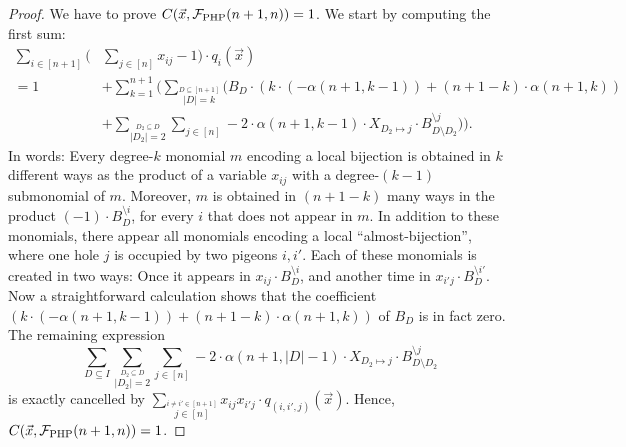\documentclass[10pt,a4paper]{article}
\newcommand{\Ff}{{\cal F}}
\newcommand{\PHP}{\Ff_{\mathrm{PHP}}}
\begin{document}
\begin{proof}
	We have to prove $C(\vec x, \PHP(n+1,n)) = 1$. We start by computing the first sum:
	\begin{align*}
		\sum_{i \in [n+1]} \Big(&\sum_{j \in [n]} x_{ij} - 1 \Big) \cdot q_i(\vec x)\\
		= 1 &+ \sum_{k = 1}^{n+1} \Big( \sum_{\stackrel{D \subseteq [n+1]}{|D| = k}} \Big( B_D \cdot ( k \cdot (- \alpha(n+1,k-1)) + (n+1-k) \cdot \alpha(n+1,k) )\\
		&+ \sum_{\stackrel{D_2 \subseteq D}{|D_2| = 2}} \sum_{j \in [n]} -2 \cdot \alpha(n+1,k-1) \cdot X_{D_2 \mapsto j} \cdot B^{\setminus j}_{D \setminus D_2} \Big) \Big).		
	\end{align*}	
	In words: Every degree-$k$ monomial $m$ encoding a local bijection is obtained in $k$ different ways as the product of a variable $x_{ij}$ with a degree-$(k-1)$ submonomial of $m$. Moreover, $m$ is obtained in $(n+1-k)$ many ways in the product $(-1) \cdot B^{\setminus i}_D$, for every $i$ that does not appear in $m$. 
	In addition to these monomials, there appear all monomials encoding a local ``almost-bijection'', where one hole $j$ is occupied by two pigeons $i, i'$. Each of these monomials is created in two ways: Once it appears in $x_{ij} \cdot B^{\setminus i}_D$, and another time in $x_{i'j} \cdot B^{\setminus i'}_D$. Now a straightforward calculation shows that the coefficient $( k \cdot (- \alpha(n+1,k-1)) + (n+1-k) \cdot \alpha(n+1,k) )$ of $B_D$ is in fact zero. The remaining expression 
	\[
	\sum_{D \subseteq I}   \sum_{\stackrel{D_2 \subseteq D}{|D_2| = 2}} \sum_{j \in [n]} -2 \cdot \alpha(n+1,|D|-1) \cdot X_{D_2 \mapsto j} \cdot B^{\setminus j}_{D \setminus D_2} 
	\]
	is exactly cancelled by $\sum_{\stackrel{i \neq i' \in [n+1]}{j \in [n]}} x_{ij}x_{i'j} \cdot q_{(i,i',j)}(\vec x)$. 
	Hence, $C(\vec x, \PHP(n+1,n)) = 1$.
\end{proof}	
\end{document}
